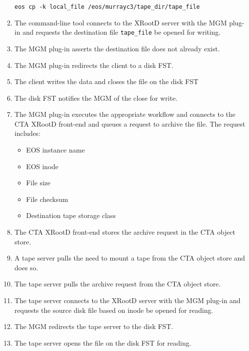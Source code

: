 \documentclass{article}
\begin{document}
\begin{enumerate}
\texttt{eos cp -k local\_file /eos/murrayc3/tape\_dir/tape\_file}

\item The command-line tool connects to the XRootD server with the MGM plug-in and requests the destination file \texttt{tape\_file} be opened for writing.

\item The MGM plug-in asserts the destination file does not already exist.

\item The MGM plug-in redirects the client to a disk FST.

\item The client writes the data and closes the file on the disk FST

\item The disk FST notifies the MGM of the close for write.

\newpage
\item The MGM plug-in executes the appropriate workflow and connects to the CTA XRootD front-end and queues a request to archive the file.  The request includes:
\begin{itemize}
	\item EOS instance name
	\item EOS inode
	\item File size
	\item File checksum
	\item Destination tape storage class
\end{itemize}

\item The CTA XRootD front-end stores the archive request in the CTA object store.

\item A tape server pulls the need to mount a tape from the CTA object store and does so.

\item The tape server pulls the archive request from the CTA object store.

\item The tape server connects to the XRootD server with the MGM plug-in and requests the source disk file based on inode be opened for reading.

\item The MGM redirects the tape server to the disk FST.

\item The tape server opens the file on the disk FST for reading.


\end{enumerate}
\end{document}
